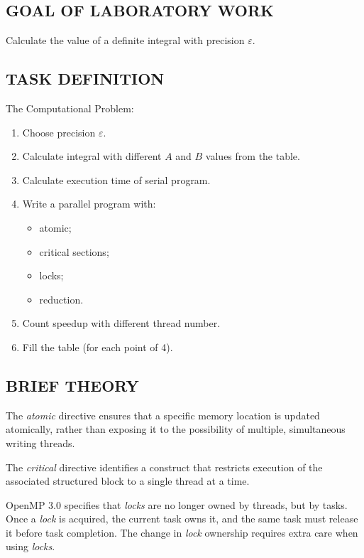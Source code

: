 \newpage
\subsection{GOAL OF LABORATORY WORK}\label{subsec:goal}

Calculate the value of a definite integral with precision $\varepsilon$.

\subsection{TASK DEFINITION}\label{subsec:task_definition}

The Computational Problem:
\begin{enumerate}
    \item Choose precision $\varepsilon$.
    \item Calculate integral with different $A$ and $B$ values from the table.
    \item Calculate execution time of serial program.
    \item {
        Write a parallel program with:
        \begin{itemize}
            \item atomic;
            \item critical sections;
            \item locks;
            \item reduction.
        \end{itemize}
    }
    \item Count speedup with different thread number.
    \item Fill the table (for each point of 4).
\end{enumerate}

\subsection{BRIEF THEORY}\label{subsec:brief_theory}

The \textit{atomic} directive ensures that a specific memory location is updated atomically, rather than exposing it to the possibility of multiple, simultaneous writing threads.

The \textit{critical} directive identifies a construct that restricts execution of the associated structured block to a single thread at a time.

OpenMP 3.0 specifies that \textit{locks} are no longer owned by threads, but by tasks. Once a \textit{lock} is acquired, the current task owns it, and the same task must release it before task completion. The change in \textit{lock} ownership requires extra care when using \textit{locks}.


